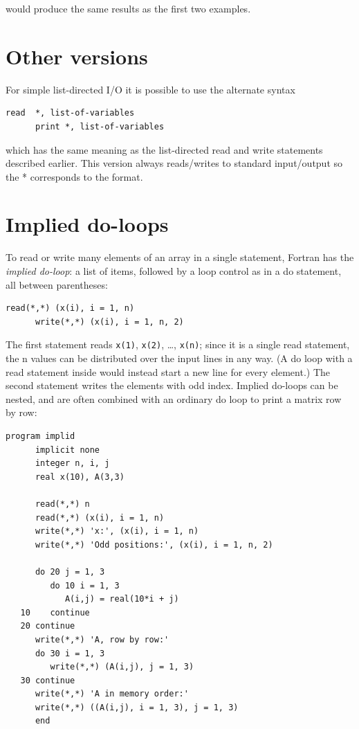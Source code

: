 would produce the same results as the first two examples.

\section{Other versions}

For simple list-directed I/O it is possible to use the alternate syntax

\begin{lstlisting}[style=fortran77]
      read  *, list-of-variables
      print *, list-of-variables
\end{lstlisting}

which has the same meaning as the list-directed read and write statements described earlier. This version always reads/writes to standard input/output so the * corresponds to the format.

\section{Implied do-loops}

To read or write many elements of an array in a single statement, Fortran has the \emph{implied do-loop}: a list of items, followed by a loop control as in a do statement, all between parentheses:

\begin{lstlisting}[style=fortran77]
      read(*,*) (x(i), i = 1, n)
      write(*,*) (x(i), i = 1, n, 2)
\end{lstlisting}

The first statement reads \texttt{x(1)}, \texttt{x(2)}, \ldots, \texttt{x(n)}; since it is a single read statement, the n values can be distributed over the input lines in any way. (A do loop with a read statement inside would instead start a new line for every element.) The second statement writes the elements with odd index. Implied do-loops can be nested, and are often combined with an ordinary do loop to print a matrix row by row:

\begin{lstlisting}[style=fortran77]
      program implid
      implicit none
      integer n, i, j
      real x(10), A(3,3)

      read(*,*) n
      read(*,*) (x(i), i = 1, n)
      write(*,*) 'x:', (x(i), i = 1, n)
      write(*,*) 'Odd positions:', (x(i), i = 1, n, 2)

      do 20 j = 1, 3
         do 10 i = 1, 3
            A(i,j) = real(10*i + j)
   10    continue
   20 continue
      write(*,*) 'A, row by row:'
      do 30 i = 1, 3
         write(*,*) (A(i,j), j = 1, 3)
   30 continue
      write(*,*) 'A in memory order:'
      write(*,*) ((A(i,j), i = 1, 3), j = 1, 3)
      end
\end{lstlisting}

